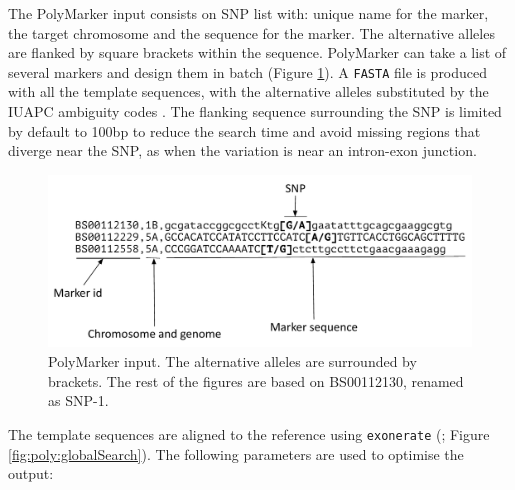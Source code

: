 The PolyMarker input consists on SNP list with: unique name for the marker, the target chromosome and the sequence for the marker. 
The alternative alleles are flanked by square brackets within the sequence. PolyMarker can take a list of several markers and design them in batch (Figure \ref{fig:poly:input}). 
A \verb|FASTA| file is produced with all the template sequences, with the alternative alleles substituted by the IUAPC ambiguity codes \citep{Cornish-Bowden1985}. 
The flanking sequence surrounding the SNP is limited by default to 100bp to reduce the search time and avoid missing regions that diverge near the SNP, as when the variation is near an intron-exon junction. 
\begin{figure}
    \includegraphics[width=1\textwidth]{PolyMarker/Figures/aln/input.pdf} 
      \caption{PolyMarker input. The alternative alleles are surrounded by brackets. The rest of the figures are based on BS00112130, renamed as SNP-1.}
    \label{fig:poly:input}
\end{figure}

The template sequences are aligned to the reference using \verb|exonerate| (\citealt{Slater2005}; Figure \ref{fig:poly:globalSearch}). 
The following parameters are used to optimise the output:

